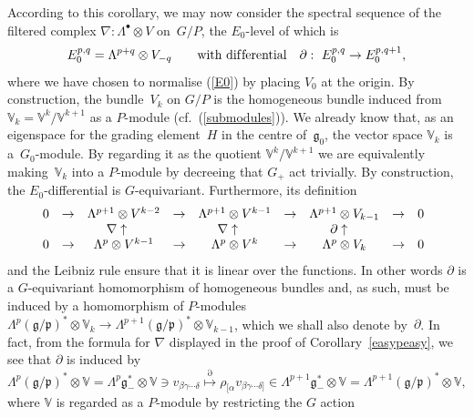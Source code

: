 \documentclass[pdftex]{sigma}
\begin{document}
According to this corollary, we may now consider the spectral sequence of the
f\/iltered complex $\nabla:\Lambda^\bullet\otimes V$ on~$G/P$, the $E_0$-level
of which is
\begin{equation}\label{E0pq}
E_0^{p,q}=\Lambda^{p+q}\otimes V_{-q}\qquad\mbox{with dif\/ferential}\quad
\partial: \ E_0^{p,q}\to E_0^{p,q+1},\end{equation}
where we have chosen to normalise (\ref{E0}) by placing $V_0$ at the origin. By
construction, the bundle~$V_k$ on $G/P$ is the homogeneous bundle induced from
${\mathbb{V}}_k={\mathbb{V}}^k/{\mathbb{V}}^{k+1}$ as a $P$-module
(cf.~(\ref{submodules})). We already know that, as an eigenspace for the
grading element~$H$ in the centre of~${\mathfrak{g}}_0$, the vector space
${\mathbb{V}}_k$ is a~$G_0$-module. By regarding it as the quotient
${\mathbb{V}}^k/{\mathbb{V}}^{k+1}$ we are equivalently making~${\mathbb{V}}_k$
into a $P$-module by decreeing that $G_+$ act trivially. By construction, the
$E_0$-dif\/ferential is $G$-equivariant. Furthermore, its def\/inition
\[\begin{array}{@{}ccccccccc}
0&\to&\Lambda^{p+1}\otimes V^{k-2}&\to&\Lambda^{p+1}\otimes V^{k-1}&\to&
\Lambda^{p+1}\otimes V_{k-1}&\to&0\\
&&\nabla\uparrow\phantom{\nabla}&&\nabla\uparrow\phantom{\nabla}&&
\partial\uparrow\phantom{\partial}\\
0&\to&\Lambda^p\otimes V^{k-1}&\to&\Lambda^p\otimes V^k&\to&
\Lambda^p\otimes V_k&\to&0
\end{array}\]
and the Leibniz rule ensure that it is linear over the functions. In other
words $\partial$ is a $G$-equivariant homomorphism of homogeneous bundles and,
as such, must be induced by a homomorphism of $P$-modules
$\Lambda^p({\mathfrak{g}}/{\mathfrak{p}})^*\otimes{\mathbb{V}}_k\to
\Lambda^{p+1}({\mathfrak{g}}/{\mathfrak{p}})^*\otimes{\mathbb{V}}_{k-1}$, which
we shall also denote by~$\partial$. In fact, from the formula for $\nabla$
displayed in the proof of Corollary~\ref{easypeasy}, we see that $\partial$ is
induced by
\begin{equation}\label{E0differential}
\Lambda^p({\mathfrak{g}}/{\mathfrak{p}})^*\otimes{\mathbb{V}}=
\Lambda^p{\mathfrak{g}}_-^*\otimes{\mathbb{V}}
\ni v_{\beta\gamma\cdots\delta}\stackrel{\partial}{\longmapsto}
\rho_{[\alpha}v_{\beta\gamma\cdots\delta]}\in
\Lambda^{p+1}{\mathfrak{g}}_-^*\otimes{\mathbb{V}}=
\Lambda^{p+1}({\mathfrak{g}}/{\mathfrak{p}})^*\otimes{\mathbb{V}},
\end{equation}
where ${\mathbb{V}}$ is regarded as a $P$-module by restricting the $G$ action
\end{document}
